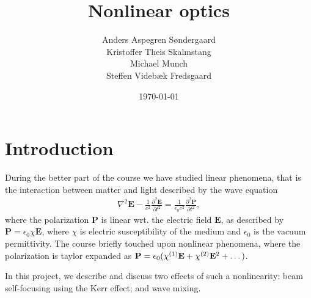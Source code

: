 \documentclass[a4paper,oneside,article]{memoir}
\newcommand\ppdiff[3][\partial]{\frac{#1^2 #2}{#1 #3^2}}
\newcommand{\order}[1]{^{\textup{(#1)}}} %
\begin{document}
\author{
  Anders Aspegren Søndergaard \\
  Kristoffer Theis Skalmstang \\
  Michael Munch \\
  Steffen Videbæk Fredsgaard \\
}
\title{Nonlinear optics}\date{\today}
\maketitle

\tableofcontents
\newpage
\chapter{Introduction}
\label{cha:intro}

During the better part of the course we have studied linear phenomena,
that is the interaction between matter and light described by the wave
equation
\begin{align}
  \label{eq:wave-general}
  \nabla^2 \mathbf E - \frac{1}{c^2} \ppdiff{\mathbf E}{t}
  = \frac{1}{\epsilon_0c^2} \ppdiff{\mathbf P}{t},
\end{align}
where the polarization $\mathbf P$ is linear wrt. the electric field
$\mathbf E$, as described by $\mathbf P = \epsilon_0 \chi
\mathbf E$, where $\chi$ is electric susceptibility of the medium and $\epsilon_0$ is the vacuum permittivity. The
course briefly touched upon nonlinear phenomena, where the polarization
is taylor expanded as $\mathbf P = \epsilon_0 ( \chi\order1 \mathbf E +
\chi\order2 \mathbf E^2 + \dots )$.

In this project, we describe and discuss two effects of such a nonlinearity: beam
self-focusing using the Kerr effect; and wave mixing.










\nocite{*}
\printbibliography
\end{document}
